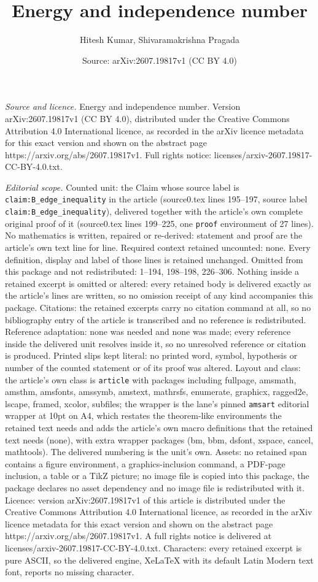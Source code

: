 \documentclass[10pt,a4paper]{amsart}
\title[Energy and independence number]{Energy and independence number}
\author{Hitesh Kumar, Shivaramakrishna Pragada}
\date{Source: arXiv:2607.19817v1 (CC BY 4.0)}
\begin{document}
\maketitle

\noindent\emph{Source and licence.} Energy and independence number. Version arXiv:2607.19817v1 (CC BY 4.0), distributed under the Creative Commons Attribution 4.0 International licence, as recorded in the arXiv licence metadata for this exact version and shown on the abstract page https://arxiv.org/abs/2607.19817v1. Full rights notice: licenses/arxiv-2607.19817-CC-BY-4.0.txt.\par\smallskip

\noindent\textit{Editorial scope.} Counted unit: the Claim whose source label is \texttt{claim:B\_edge\_inequality} in the article (source0.tex lines 195--197, source label \texttt{claim:B\_edge\_inequality}), delivered together with the article's own complete original proof of it (source0.tex lines 199--225, one \texttt{proof} environment of 27 lines). No mathematics is written, repaired or re-derived: statement and proof are the article's own text line for line. Required context retained uncounted: none. Every definition, display and label of those lines is retained unchanged. Omitted from this package and not redistributed: 1--194, 198--198, 226--306. Nothing inside a retained excerpt is omitted or altered: every retained body is delivered exactly as the article's lines are written, so no omission receipt of any kind accompanies this package. Citations: the retained excerpts carry no citation command at all, so no bibliography entry of the article is transcribed and no reference is redistributed. Reference adaptation: none was needed and none was made; every reference inside the delivered unit resolves inside it, so no unresolved reference or citation is produced. Printed slips kept literal: no printed word, symbol, hypothesis or number of the counted statement or of its proof was altered. Layout and class: the article's own class is \texttt{article} with packages including fullpage, amsmath, amsthm, amsfonts, amssymb, amstext, mathrsfs, enumerate, graphicx, ragged2e, lscape, framed, xcolor, subfiles; the wrapper is the lane's pinned \texttt{amsart} editorial wrapper at 10pt on A4, which restates the theorem-like environments the retained text needs and adds the article's own macro definitions that the retained text needs (none), with extra wrapper packages (bm, bbm, dsfont, xspace, cancel, mathtools). The delivered numbering is the unit's own. Assets: no retained span contains a figure environment, a graphics-inclusion command, a PDF-page inclusion, a table or a TikZ picture; no image file is copied into this package, the package declares no asset dependency and no image file is redistributed with it. Licence: version arXiv:2607.19817v1 of this article is distributed under the Creative Commons Attribution 4.0 International licence, as recorded in the arXiv licence metadata for this exact version and shown on the abstract page https://arxiv.org/abs/2607.19817v1. A full rights notice is delivered at licenses/arxiv-2607.19817-CC-BY-4.0.txt. Characters: every retained excerpt is pure ASCII, so the delivered engine, XeLaTeX with its default Latin Modern text font, reports no missing character.
\end{document}
